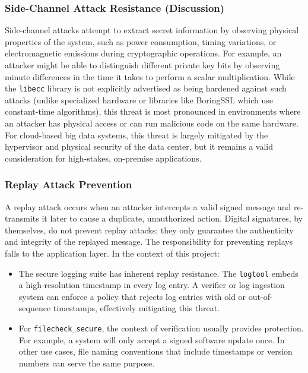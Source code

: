 \documentclass[12pt, letterpaper]{article}
\begin{document}
\subsubsection{Side-Channel Attack Resistance (Discussion)}
Side-channel attacks attempt to extract secret information by observing physical properties of the system, such as power consumption, timing variations, or electromagnetic emissions during cryptographic operations. For example, an attacker might be able to distinguish different private key bits by observing minute differences in the time it takes to perform a scalar multiplication. While the \texttt{libecc} library is not explicitly advertised as being hardened against such attacks (unlike specialized hardware or libraries like BoringSSL which use constant-time algorithms), this threat is most pronounced in environments where an attacker has physical access or can run malicious code on the same hardware. For cloud-based big data systems, this threat is largely mitigated by the hypervisor and physical security of the data center, but it remains a valid consideration for high-stakes, on-premise applications.

\subsubsection{Replay Attack Prevention}
A replay attack occurs when an attacker intercepts a valid signed message and re-transmits it later to cause a duplicate, unauthorized action. Digital signatures, by themselves, do not prevent replay attacks; they only guarantee the authenticity and integrity of the replayed message. The responsibility for preventing replays falls to the application layer. In the context of this project:
\begin{itemize}
	\item The secure logging suite has inherent replay resistance. The \texttt{logtool} embeds a high-resolution timestamp in every log entry. A verifier or log ingestion system can enforce a policy that rejects log entries with old or out-of-sequence timestamps, effectively mitigating this threat.
	\item For \texttt{filecheck\_secure}, the context of verification usually provides protection. For example, a system will only accept a signed software update once. In other use cases, file naming conventions that include timestamps or version numbers can serve the same purpose.
\end{itemize}
	
\end{document}

